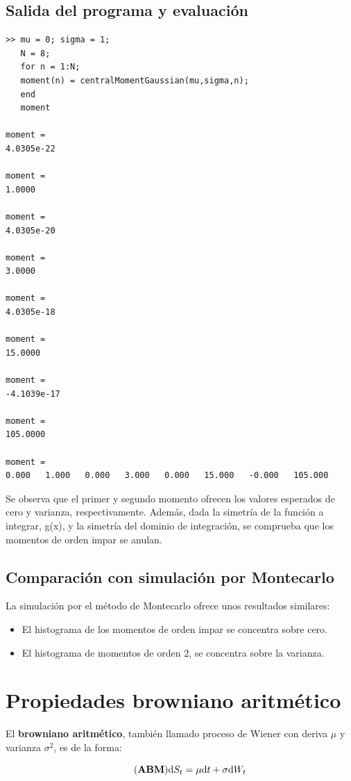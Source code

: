 \documentclass[a4paper,11pt]{article}
\begin{document}
\subsection{Salida del programa y evaluaci\'on}

\begin{lstlisting}
>> mu = 0; sigma = 1;
   N = 8;
   for n = 1:N;
   moment(n) = centralMomentGaussian(mu,sigma,n);
   end
   moment

moment =
4.0305e-22

moment =
1.0000

moment =
4.0305e-20

moment =
3.0000

moment =
4.0305e-18

moment =
15.0000

moment =
-4.1039e-17

moment =
105.0000

moment =
0.000   1.000   0.000   3.000   0.000   15.000   -0.000   105.000
\end{lstlisting}

Se observa que el primer y segundo momento ofrecen los valores esperados de cero y
varianza, respectivamente. Adem\'as, dada la simetr\'ia de la funci\'on a
integrar, g(x), y la simetr\'ia del dominio de integraci\'on, se comprueba que
los momentos de orden impar se anulan.

\subsection{Comparaci\'on con simulaci\'on por Montecarlo}
La simulaci\'on por el m\'etodo de Montecarlo ofrece unos resultados similares:
\begin{itemize}
   \item El histograma de los momentos de orden impar se concentra sobre cero.
   \item El histograma de momentos de orden 2, se concentra sobre la varianza.
\end{itemize}

\pagebreak
\section{Propiedades browniano aritm\'etico}
El \textbf{browniano aritm\'etico}, tambi\'en llamado proceso de Wiener con deriva $\mu$ y
varianza $\sigma^2$, es de la forma:

\begin{equation*}
   \tag{\textbf{ABM}}
   \mathrm{d}S_t = \mu\mathrm{d}t + \sigma\mathrm{d}W_t
\end{equation*}
\end{document}
